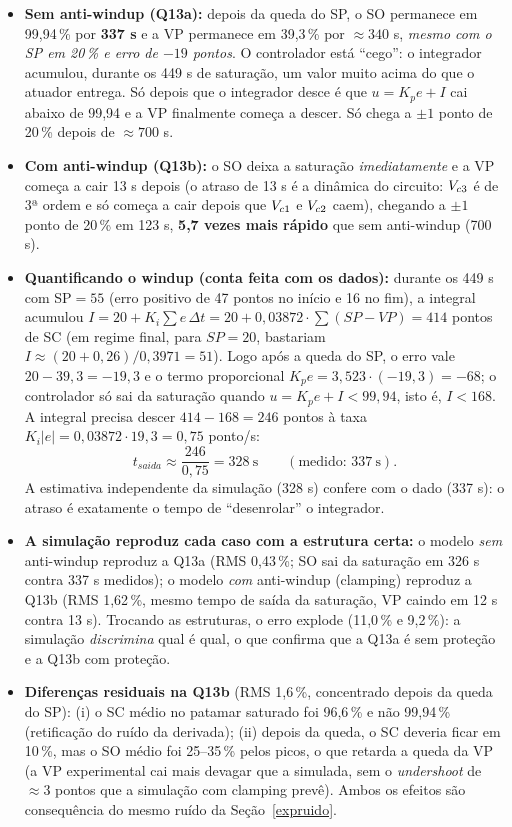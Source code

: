 \begin{itemize}
\item \textbf{Sem anti-windup (Q13a):} depois da queda do SP, o SO permanece em 99,94\,\% por \textbf{337 s} e a VP permanece em 39,3\,\% por $\approx340$ s, \emph{mesmo com o SP em 20\,\% e erro de $-19$ pontos}. O controlador está ``cego'': o integrador acumulou, durante os 449 s de saturação, um valor muito acima do que o atuador entrega. Só depois que o integrador desce é que $u=K_pe+I$ cai abaixo de 99,94 e a VP finalmente começa a descer. Só chega a $\pm1$ ponto de 20\,\% depois de $\approx700$ s.
\item \textbf{Com anti-windup (Q13b):} o SO deixa a saturação \emph{imediatamente} e a VP começa a cair 13 s depois (o atraso de 13 s é a dinâmica do circuito: $V_{c3}$ é de 3ª ordem e só começa a cair depois que $V_{c1}$ e $V_{c2}$ caem), chegando a $\pm1$ ponto de 20\,\% em 123 s, \textbf{5,7 vezes mais rápido} que sem anti-windup (700 s).
\item \textbf{Quantificando o windup (conta feita com os dados):} durante os 449 s com SP$=55$ (erro positivo de 47 pontos no início e 16 no fim), a integral acumulou $I=20+K_i\sum e\,\Delta t=20+0{,}03872\cdot\sum(SP-VP)=414$ pontos de SC (em regime final, para $SP=20$, bastariam $I\approx(20+0{,}26)/0{,}3971=51$). Logo após a queda do SP, o erro vale $20-39{,}3=-19{,}3$ e o termo proporcional $K_pe=3{,}523\cdot(-19{,}3)=-68$; o controlador só sai da saturação quando $u=K_pe+I<99{,}94$, isto é, $I<168$. A integral precisa descer $414-168=246$ pontos à taxa $K_i|e|=0{,}03872\cdot19{,}3=0{,}75$ ponto/s:
\[t_{saida}\approx\frac{246}{0{,}75}=328\ \mathrm{s}\qquad(\text{medido: }337\ \mathrm{s}).\]
A estimativa independente da simulação (328 s) confere com o dado (337 s): o atraso é exatamente o tempo de ``desenrolar'' o integrador.
\item \textbf{A simulação reproduz cada caso com a estrutura certa:} o modelo \emph{sem} anti-windup reproduz a Q13a (RMS 0,43\,\%; SO sai da saturação em 326 s contra 337 s medidos); o modelo \emph{com} anti-windup (clamping) reproduz a Q13b (RMS 1,62\,\%, mesmo tempo de saída da saturação, VP caindo em 12 s contra 13 s). Trocando as estruturas, o erro explode (11,0\,\% e 9,2\,\%): a simulação \emph{discrimina} qual é qual, o que confirma que a Q13a é sem proteção e a Q13b com proteção.
\item \textbf{Diferenças residuais na Q13b} (RMS 1,6\,\%, concentrado depois da queda do SP): (i) o SC médio no patamar saturado foi 96,6\,\% e não 99,94\,\% (retificação do ruído da derivada); (ii) depois da queda, o SC deveria ficar em 10\,\%, mas o SO médio foi 25--35\,\% pelos picos, o que retarda a queda da VP (a VP experimental cai mais devagar que a simulada, sem o \emph{undershoot} de $\approx3$ pontos que a simulação com clamping prevê). Ambos os efeitos são consequência do mesmo ruído da Seção~\ref{expruido}.
\end{itemize}
